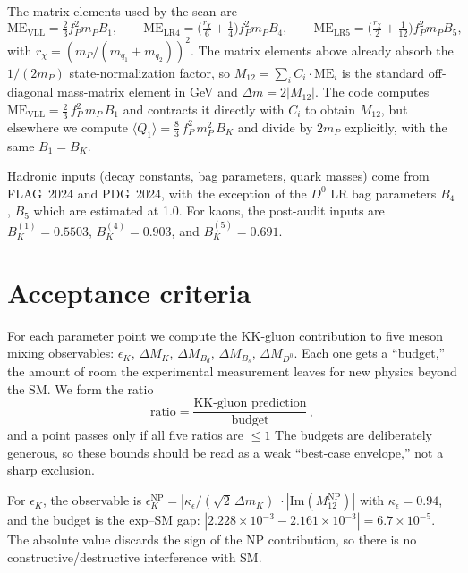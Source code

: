 \documentclass[11pt]{article}
\begin{document}
The matrix elements used by the scan are
\begin{equation}
  \mathrm{ME}_{\mathrm{VLL}} = \tfrac{2}{3} f_P^2 m_P B_1, \qquad
  \mathrm{ME}_{\mathrm{LR4}} = \bigl(\tfrac{r_\chi}{6} + \tfrac{1}{4}\bigr)
    f_P^2 m_P B_4, \qquad
  \mathrm{ME}_{\mathrm{LR5}} = \bigl(\tfrac{r_\chi}{2} + \tfrac{1}{12}\bigr)
    f_P^2 m_P B_5,
\end{equation}
with $r_\chi = (m_P / (m_{q_1} + m_{q_2}))^2$. The matrix elements above
already absorb the $1/(2m_P)$ state-normalization factor, so $M_{12} =
\sum_i C_i \cdot \mathrm{ME}_i$ is the standard off-diagonal mass-matrix
element in GeV and $\Delta m = 2|M_{12}|$. The code computes
$\mathrm{ME}_{\mathrm{VLL}} = \tfrac{2}{3}\,f_P^2\,m_P\,B_1$ and contracts
it directly with $C_i$ to obtain $M_{12}$, but elsewhere we compute
$\langle Q_1\rangle = \tfrac{8}{3}\,f_P^2\,m_P^2\,B_K$ and divide by
$2m_P$ explicitly, with the same $B_1 = B_K$.


Hadronic inputs (decay constants, bag parameters, quark masses) come from
FLAG~2024 and PDG~2024, with the exception of the $D^0$ LR bag parameters
$B_4$, $B_5$ which are estimated at 1.0.
For kaons, the post-audit inputs are $B_K^{(1)} = 0.5503$,
$B_K^{(4)} = 0.903$, and $B_K^{(5)} = 0.691$.


\section{Acceptance criteria}

For each parameter point we compute the KK-gluon contribution to five meson
mixing observables: $\epsilon_K$, $\Delta M_K$, $\Delta M_{B_d}$,
$\Delta M_{B_s}$, $\Delta M_{D^0}$. Each one gets a ``budget,'' the
amount of room the experimental measurement leaves for new physics beyond the
SM. We form the ratio
\begin{equation}
  \text{ratio} = \frac{\text{KK-gluon prediction}}{\text{budget}}\,,
\end{equation}
and a point passes only if all five ratios are $\le 1$
The budgets are deliberately generous, so these bounds should be read as a
weak ``best-case envelope,'' not a sharp exclusion.

For $\epsilon_K$, the observable is
$\epsilon_K^{\mathrm{NP}} = |\kappa_\epsilon / (\sqrt{2}\,\Delta m_K)| \cdot
|\mathrm{Im}(M_{12}^{\mathrm{NP}})|$
with $\kappa_\epsilon = 0.94$, and the budget is the exp--SM gap:
$|2.228\times10^{-3} - 2.161\times10^{-3}| = 6.7\times10^{-5}$.
The absolute value discards the sign of the NP contribution, so there is no
constructive/destructive interference with SM.
\end{document}
